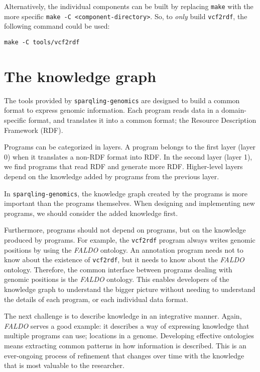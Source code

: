   Alternatively, the individual components can be built by replacing
  \texttt{make} with the more specific \texttt{make -C <component-directory>}.
  So, to \emph{only} build \texttt{vcf2rdf}, the following command could be
  used:

\begin{siderules}
\begin{verbatim}
make -C tools/vcf2rdf
\end{verbatim}
\end{siderules}

\chapter{The knowledge graph}

  The tools provided by \texttt{sparqling-genomics} are designed to build a
  common format to express genomic information.  Each program reads data in
  a domain-specific format, and translates it into a common format; the
  Resource Description Framework (RDF).

  Programs can be categorized in layers.  A program belongs to the first
  layer (layer 0) when it translates a non-RDF format into RDF.  In the
  second layer (layer 1), we find programs that read RDF and generate more
  RDF.  Higher-level layers depend on the knowledge added by programs from
  the previous layer.

  In \texttt{sparqling-genomics}, the knowledge graph created by the programs
  is more important than the programs themselves.  When designing and
  implementing new programs, we should consider the added knowledge first.

  Furthermore, programs should not depend on programs, but on the knowledge
  produced by programs.  For example, the \texttt{vcf2rdf} program always
  writes genomic positions by using the \emph{FALDO} ontology.  An annotation
  program needs not to know about the existence of \texttt{vcf2rdf}, but it
  needs to know about the \emph{FALDO} ontology.  Therefore, the common
  interface between programs dealing with genomic positions is the \emph{FALDO}
  ontology.  This enables developers of the knowledge graph to understand
  the bigger picture without needing to understand the details of each
  program, or each individual data format.

  The next challenge is to describe knowledge in an integrative manner.  Again,
  \emph{FALDO} serves a good example: it describes a way of expressing knowledge
  that multiple programs can use; locations in a genome.  Developing effective
  ontologies means extracting common patterns in how information is described.
  This is an ever-ongoing process of refinement that changes over time with the
  knowledge that is most valuable to the researcher.

